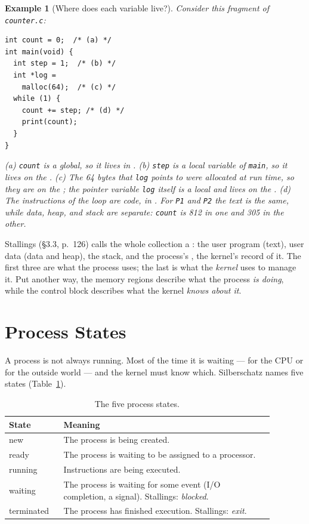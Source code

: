 \documentclass[11pt]{article}
\newtheorem{example}{Example}
\begin{document}
\begin{example}[Where does each variable live?]
Consider this fragment of \texttt{counter.c}:
\begin{verbatim}
int count = 0;  /* (a) */
int main(void) {
  int step = 1;  /* (b) */
  int *log =
    malloc(64);  /* (c) */
  while (1) {
    count += step; /* (d) */
    print(count);
  }
}
\end{verbatim}
(a) \texttt{count} is a global, so it lives in . (b) \texttt{step} is
a local variable of \texttt{main}, so it lives on the . (c) The 64
bytes that \texttt{log} points to were allocated at run time, so they are on the
; the pointer variable \texttt{log} itself is a local and lives on the
. (d) The instructions of the loop are code, in . For
\texttt{P1} and \texttt{P2} the text is the same, while data, heap, and stack
are separate: \texttt{count} is 812 in one and 305 in the other.
\end{example}

Stallings (\S3.3, p.~126) calls the whole collection a : the
user program (text), user data (data and heap), the stack, and the process's
, the kernel's record of it. The first three are what the
process uses; the last is what the \emph{kernel} uses to manage it. Put another
way, the memory regions describe what the process \emph{is doing}, while the
control block describes what the kernel \emph{knows about it}.

\section{Process States}

\noindent{}

A process is not always running. Most of the time it is waiting --- for the CPU
or for the outside world --- and the kernel must know which. Silberschatz names
five states (Table~\ref{tab:states}).

\begin{table}[h]
\centering\small
\renewcommand{\arraystretch}{1.25}
\begin{tabular}{@{}>{\raggedright\arraybackslash}p{0.18\linewidth}>{\raggedright\arraybackslash}p{0.7\linewidth}@{}}
\toprule
\textbf{State} & \textbf{Meaning} \\
\midrule
new & The process is being created. \\
ready & The process is waiting to be assigned to a processor. \\
running & Instructions are being executed. \\
waiting & The process is waiting for some event (I/O completion, a signal). Stallings: \emph{blocked}. \\
terminated & The process has finished execution. Stallings: \emph{exit}. \\
\bottomrule
\end{tabular}
\caption{The five process states.}
\label{tab:states}
\end{table}
\end{document}
